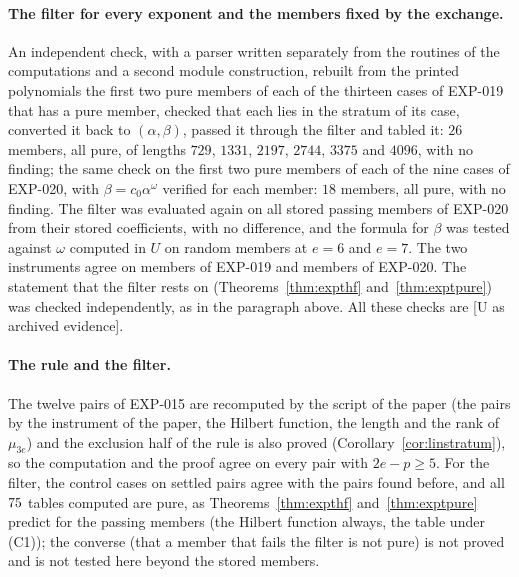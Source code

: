 \documentclass[11pt]{article}
\theoremstyle{definition}
\theoremstyle{remark}
\newcommand{\EXP}[1]{\mbox{EXP-#1}}
\begin{document}
\paragraph{The filter for every exponent and the members fixed by the exchange.} An independent check, with a parser written separately from the routines of the computations and a second module construction, rebuilt from the printed polynomials the first two pure members of each of the thirteen cases of \EXP{019} that has a pure member, checked that each lies in the stratum of its case, converted it back to $(\alpha,\beta)$, passed it through the filter and tabled it: $26$ members, all pure, of lengths $729$, $1331$, $2197$, $2744$, $3375$ and $4096$, with no finding; the same check on the first two pure members of each of the nine cases of \EXP{020}, with $\beta=c_0\alpha^\omega$ verified for each member: $18$ members, all pure, with no finding. The filter was evaluated again on all \nsymPassing{} stored passing members of \EXP{020} from their stored coefficients, with no difference, and the formula for $\beta$ was tested against $\omega$ computed in $U$ on random members at $e=6$ and $e=7$. The two instruments agree on \nevtSample{} members of \EXP{019} and \nsymSample{} members of \EXP{020}. The statement that the filter rests on (Theorems~\ref{thm:expthf} and~\ref{thm:exptpure}) was checked independently, as in the paragraph above. All these checks are [U as archived evidence].

\paragraph{The rule and the filter.} The twelve pairs of \EXP{015} are recomputed by the script of the paper (the pairs by the instrument of the paper, the Hilbert function, the length and the rank of $\mu_{3e}$) and the exclusion half of the rule is also proved (Corollary~\ref{cor:linstratum}), so the computation and the proof agree on every pair with $2e-p\ge5$. For the filter, the control cases on settled pairs agree with the pairs found before, and all $75{}$ tables computed are pure, as Theorems~\ref{thm:expthf} and~\ref{thm:exptpure} predict for the passing members (the Hilbert function always, the table under (C1)); the converse (that a member that fails the filter is not pure) is not proved and is not tested here beyond the stored members.
\end{document}
